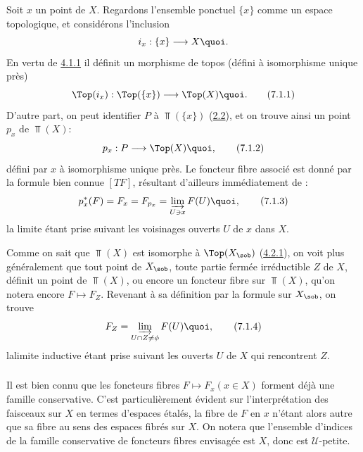 \documentclass[10pt]{../fichiers-configuration-latex/smfart}
\begin{document}
Soit $x$ un point de $X$. Regardons l'ensemble ponctuel $\{x\}$
comme un espace topologique, et considérons l'inclusion
$$
i_x:\{x\}\longrightarrow X{\quoi}.
$$
En vertu de \hyperref[IV.subsubsec4.1.1]{4.1.1} il définit un morphisme de topos
(défini à isomorphisme unique près)
\begin{equation*}
\Top(i_x):\Top(\{x\})\longrightarrow \Top(X){\quoi}.\tag{7.1.1}
\end{equation*}
D'autre part, on peut identifier $P$ à $\Top(\{x\})$
(\hyperref[IV.subsec2.2]{2.2}), et on trouve ainsi un point $p_x$ de
$\Top(X)$:
\begin{equation*}
p_x:P\longrightarrow \Top(X){\quoi},\tag{7.1.2}
\end{equation*}
défini par $x$ à isomorphisme unique près. Le foncteur fibre associé
est donné par la formule bien connue $[TF]$, résultant d'ailleurs
immédiatement de :
\begin{equation*}
p^{\ast}_x(F)=F_x=F_{p_x}=\varinjlim_{U\ni x}F(U){\quoi},\tag{7.1.3}
\end{equation*}
la limite étant prise suivant les voisinages ouverts $U$ de $x$ dans
$X$.

Comme on sait que $\Top(X)$ est isomorphe à $\Top(X_{\sob})$
(\hyperref[IV.subsubsec4.2.1]{4.2.1}), on voit plus généralement que tout point
de $X_{\sob}$, \ie toute partie fermée irréductible $Z$ de $X$,
définit un point de $\Top(X)$, ou encore un foncteur fibre sur
$\Top(X)$, qu'on notera encore $F\mapsto F_Z$. Revenant à sa
définition par la formule  sur $X_{\sob}$, on trouve
\begin{equation*}
F_Z=\varinjlim_{U\cap Z\neq \phi} F(U){\quoi},\tag{7.1.4}
\end{equation*}
la\pageoriginale limite inductive étant prise suivant les ouverts
$U$ de $X$ qui rencontrent $Z$.

\setcounter{subsubsection}{4}
\subsubsection{}
Il est bien connu que les foncteurs fibres $F\mapsto F_x(x\in X)$
forment déjà une famille conservative. C'est particulièrement
évident sur l'interprétation des faisceaux sur $X$ en termes
d'espaces étalés, la fibre de $F$ en $x$ n'étant alors autre que sa
fibre au sens des espaces fibrés sur $X$. On notera que l'ensemble
d'indices de la famille conservative de foncteurs fibres envisagée
est $X$, donc est $𝒰$-petite.
\end{document}
